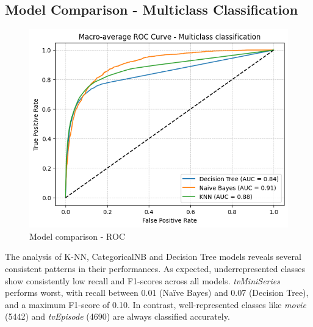 \subsection{Model Comparison - Multiclass Classification}
\begin{figure}
    \centering
    \captionsetup{justification=raggedleft, width=1\linewidth}
    \caption{Model comparison - ROC}
    \label{fig:multiclass_roc}
    \includegraphics[width=0.9\linewidth]{plots/ROC_multiclass.png}
\end{figure}
The analysis of K-NN, CategoricalNB and Decision Tree models reveals several consistent patterns in their performances. 
As expected, underrepresented classes show consistently low recall and F1-scores across all models.
\textit{tvMiniSeries} performs worst, with recall between 0.01 (Naïve Bayes) and 0.07 (Decision Tree), and a maximum F1-score of 0.10. 
In contrast, well-represented classes like \textit{movie} (5442) and \textit{tvEpisode} (4690) are always classified accurately.\\ 
